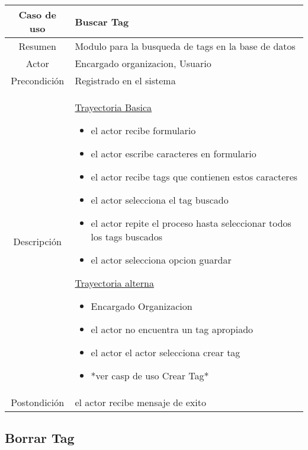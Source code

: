 \documentclass[letterpaper,openright,10pt,oneside]{report}
\begin{document}
\begin{tabular}{|c|p{110mm}|}
\hline
	Caso de uso &  Buscar Tag\\
\hline
	Resumen & Modulo para la busqueda de tags en la base de datos\\
\hline
	Actor & Encargado organizacion, Usuario\\
\hline
	Precondición & Registrado en el sistema\\
\hline
	Descripción & 
	\underline{Trayectoria Basica}
	\begin{itemize}
		\item el actor recibe formulario
		\item el actor escribe caracteres en formulario
		\item el actor recibe tags que contienen estos caracteres
		\item el actor selecciona el tag buscado
		\item el actor repite el proceso hasta seleccionar todos los tags buscados
		\item el actor selecciona opcion guardar
	\end{itemize}
	\underline{Trayectoria alterna}
	\begin{itemize}
		\item Encargado Organizacion
		\item el actor no encuentra un tag apropiado
		\item el actor el actor selecciona crear tag
		\item *ver casp de uso Crear Tag* 
	\end{itemize}\\
\hline
	Postondición & el actor recibe mensaje de exito\\
\hline
\end{tabular}

\subsection{Borrar Tag}
\end{document}
